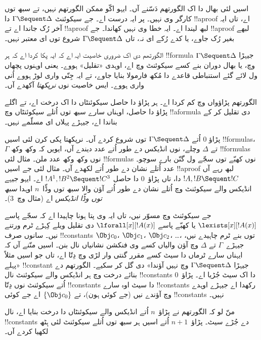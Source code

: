 \documentclass[../../../include/open-logic-section]{subfiles}
\begin{document}


اسیں  لئی بھال دا اک الگورتھم دَسّنے آں۔ ایہو اکّو ممکن الگورتھم نہیں، تے سبھ توں کارگر وی نہیں۔ پر ایہ درست اے۔ جے سیکوئنٹ $\Gamma \Sequent \Delta$ دا !!a{proof} اے، تاں ایہ آخر رُک جاندا اے تے !!a{proof} لبھ لیندا اے۔ ایہ خطا وی نہیں کھاندا۔ جے !!a{proof} لبھے بغیر رُک جاوے، یا کدے رُکے ای نہ، تاں $\Gamma
\Sequent \Delta$ شروع توں ای معتبر نہیں۔

الگورتھم دی اک ضروری خاصیت ایہ اے کہ ایہ پکا کردا اے کہ ہر !!{formula} جیہڑا $\Gamma \Sequent \Delta$ وچ، یا بھال دوران بنے کسے سیکوئنٹ وچ اے، اوہدی «تقلیل» ہووے۔ یعنی اوہنوں پچھاں ول لائے گئے استنباطی قاعدے دا مُکھ فارمولا بنایا جاوے، تے ایہ جِنّی واری لوڑ ہووے اُنی واری ہووے۔ ایس خاصیت نوں \emph{نرپکھتا} آکھدے آں۔

الگورتھم پڑاؤواں وچ کم کردا اے۔ ہر پڑاؤ دا حاصل سیکوئنٹاں دا اک درخت اے، تے اگلے پڑاؤ دا حاصل، اوہناں سارے سبھ توں اُتلے سیکوئنٹاں وچ !!a{formula} دی تقلیل کر کے بناندا اے، جیہڑے پہلاں ای مسلّمے نہیں۔

پڑاؤ $0$ اُتے $\Gamma \Sequent \Delta$ توں شروع کردے آں۔ نرپکھتا پکی کرن لئی اسیں !!{formula}s، $ \Gamma$ تے $ \Delta$ وچلے، نوں انڈیکس دے طور اُتے عدد دیندے آں، ایویں کہ وکھ وکھ !!{formula}s نوں وکھ وکھ عدد ملن۔ مثال لئی !!{formula}s نوں کھبّے توں سجّے ول گنّن بارے سوچو۔ عدد اُتلے نشان دے طور اُتے لکھدے آں۔ مثال لئی جے اسیں !!a{proof} لبھ رہے آں $!A, !B \Sequent !C$ دا، تاں پڑاؤ~$0$ دا حاصل $!A^1, !B^2 \Sequent !C^3$ اے۔ ایہو جیہے انڈیکس والے سیکوئنٹ وچ اُتلے نشان دے طور اُتے آؤن والا سبھ توں وڈّا~$n$ اوہدا \emph{سبھ توں وڈّا انڈیکس} اے (مثال وچ~$3$)۔

جے سیکوئنٹ وچ مسوّر نیں، تاں ایہ وی پتا ہونا چاہیدا اے کہ سجّے پاسے $ \lexists[x][!A(x)]$ یا کھبّے پاسے $ \lforall[x][!A(x)]$ دی تقلیل ویلے کِہڑے ٹرم ورتنے نیں۔ سانوں صرف !!{constant}s $ \Obj c_0$، $ \Obj c_1$، $ \Obj c_2$، \dots، توں بنے ٹرم چاہیدے نیں، جیہڑے~$\Gamma$ تے $ \Delta$ وچ آؤن والیاں کسے وی فنکشن نشانیاں نال بنن۔ اسیں منّنے آں کہ ایہناں سارے ٹرماں دا سیٹ کسے مقرر گنتی وار لڑی وچ دِتّا اے، تاں جو اسیں مثلاً «پہلے !!{constant} جیہڑا $ \Gamma \Sequent \Delta$ وچ نہیں آؤندا» دی گل کر سکیے۔ الگورتھم دے بنائے درخت وچ ہر انڈیکس والے سیکوئنٹ نال !!{constant}s دا اک سیٹ جُڑیا اے۔ پڑاؤ~$0$ اُتے سیکوئنٹ نوں دِتّا !!{constant}s دا سیٹ اوہ سارے !!{constant}s رکھدا اے جیہڑے اوہدے وچ آؤندے نیں (جے کوئی ہون)، تے $\{\Obj c_0\}$ اے جے کوئی !!{constant}s نہیں۔

منّ لو کہ الگورتھم نے پڑاؤ~$n$ اُتے انڈیکس والے سیکوئنٹاں دا درخت بنایا اے، نال !!{constant}s دے جُڑے سیٹ۔ پڑاؤ~$n+1$ اُتے اسیں ہر سبھ توں اُتلے سیکوئنٹ لئی ہِٹھ لکھیا کردے آں۔
\end{document}
